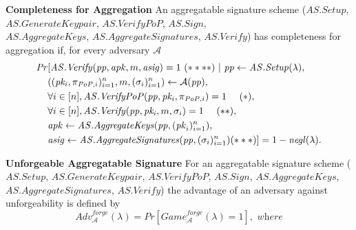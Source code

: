 \noindent \textbf{Completeness for Aggregation} An aggregatable signature scheme 
($\mathit{AS.Setup}$, $\mathit{AS.GenerateKeypair}$, $\mathit{AS.VerifyPoP}$, $\mathit{AS.Sign}$,\\
$\mathit{AS.AggregateKeys}$, $\mathit{AS.AggregateSignatures}$, $\mathit{AS.Verify}$)
has completeness for aggregation if, for every adversary $\mathcal{A}$
\begin{align*}
\mathit{Pr} & [\mathit{AS.Verify}(\mathit{pp}, \mathit{apk}, m, \mathit{asig}) = 1 \ (\ast\ast\ast\ast) \ | \ \mathit{pp} \leftarrow \mathit{AS.Setup}(\lambda), \\
& ((\mathit{pk_i}, \pi_{\mathit{PoP},i})_{i=1}^n, m, (\sigma_i)_{i=1}^{n}) \leftarrow \mathcal{A}(\mathit{\mathit{pp})}, \\
& \forall i \in [n], \mathit{AS.VerifyPoP}(\mathit{pp}, \mathit{pk_i}, \pi_{\mathit{PoP},i}) = 1 \ \ \ \ (\ast), \\
& \forall i \in [n], \mathit{AS.Verify}(\mathit{pp}, \mathit{pk_i}, m, \sigma_i) = 1 \ \ \ \ (\ast\ast),\\
& \mathit{apk} \leftarrow \mathit{AS.AggregateKeys}(\mathit{pp},  (\mathit{pk}_{i})_{i=1}^{n}), \\
& \mathit{asig} \leftarrow \mathit{AS.AggregateSignatures}(\mathit{pp}, (\sigma_i)_{i=1}^n) (\ast\ast\ast)] = 1- \mathit{negl}(\lambda).
\end{align*}

\noindent \textbf{Unforgeable Aggregatable Signature}
For an aggregatable signature scheme ($\mathit{AS.Setup}$, $\mathit{AS.GenerateKeypair}$, $\mathit{AS.VerifyPoP}$, $\mathit{AS.Sign}$,
$\mathit{AS.AggregateKeys}$, $\mathit{AS.AggregateSignatures}$, $\mathit{AS.Verify}$)
the advantage of an adversary against unforgeability is defined by
$$\mathit{Adv}^{\mathit{forge}}_{\mathcal{A}}({\lambda}) = \mathit{Pr}[\mathit{Game}^{\mathit{forge}}_{\mathcal{A}}({\lambda}) =1], \textit{\ where}$$


